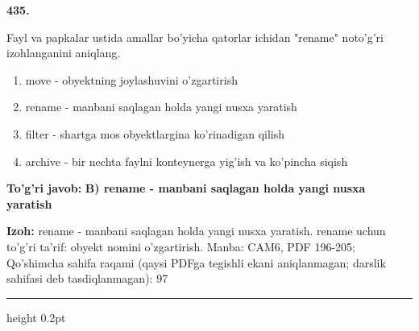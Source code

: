 \documentclass[10pt,a4paper]{article}
\begin{document}
{\bfseries\sffamily\color{ink} 435.}
\par
Fayl va papkalar ustida amallar bo'yicha qatorlar ichidan "rename" noto'g'ri izohlanganini aniqlang.
\begin{enumerate}[label=\Alph*),leftmargin=9mm]
\item move - obyektning joylashuvini o'zgartirish
\item rename - manbani saqlagan holda yangi nusxa yaratish
\item filter - shartga mos obyektlargina ko'rinadigan qilish
\item archive - bir nechta faylni konteynerga yig'ish va ko'pincha siqish
\end{enumerate}
\begin{tcolorbox}[enhanced,breakable,colback=teal!4,colframe=teal!60!black,boxrule=0.45pt,arc=1.2mm,left=2.7mm,right=2.7mm,top=1.8mm,bottom=1.8mm,before skip=2mm,after skip=2mm]
{\bfseries\sffamily\color{teal}To'g'ri javob:} \textbf{B) rename - manbani saqlagan holda yangi nusxa yaratish}
\par\smallskip
{\bfseries Izoh:} rename - manbani saqlagan holda yangi nusxa yaratish. rename uchun to'g'ri ta'rif: obyekt nomini o'zgartirish. Manba: CAM6, PDF 196-205; Qo'shimcha sahifa raqami (qaysi PDFga tegishli ekani aniqlanmagan; darslik sahifasi deb tasdiqlanmagan): 97
\end{tcolorbox}
\vspace{2mm}\hrule height 0.2pt\vspace{3mm}
\end{document}
